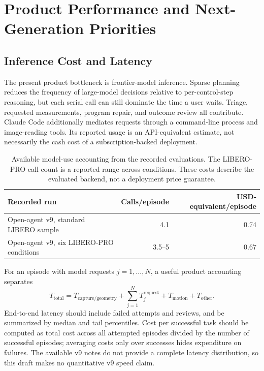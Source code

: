\section{Product Performance and Next-Generation Priorities}
\label{sec:discussion}

\subsection{Inference Cost and Latency}
The present product bottleneck is frontier-model inference. Sparse planning reduces the frequency of large-model decisions relative to per-control-step reasoning, but each serial call can still dominate the time a user waits. Triage, requested measurements, program repair, and outcome review all contribute. Claude Code additionally mediates requests through a command-line process and image-reading tools. Its reported usage is an API-equivalent estimate, not necessarily the cash cost of a subscription-backed deployment.

\begin{table}[t]
\centering
\begin{tabular}{@{}lrr@{}}
\toprule
Recorded run & Calls/episode & USD-equivalent/episode \\
\midrule
Open-agent v9, standard LIBERO sample & 4.1 & 0.74 \\
Open-agent v9, six LIBERO-PRO conditions & 3.5--5 & 0.67 \\
\bottomrule
\end{tabular}
\caption{Available model-use accounting from the recorded evaluations. The LIBERO-PRO call count is a reported range across conditions. These costs describe the evaluated backend, not a deployment price guarantee.}
\label{tab:cost}
\end{table}

For an episode with model requests $j=1,\ldots,N$, a useful product accounting separates
\begin{equation}
 T_{\mathrm{total}} = T_{\mathrm{capture/geometry}} + \sum_{j=1}^{N}T_j^{\mathrm{request}} + T_{\mathrm{motion}} + T_{\mathrm{other}}.
\end{equation}
End-to-end latency should include failed attempts and reviews, and be summarized by median and tail percentiles. Cost per successful task should be computed as total cost across all attempted episodes divided by the number of successful episodes; averaging costs only over successes hides expenditure on failures. The available v9 notes do not provide a complete latency distribution, so this draft makes no quantitative v9 speed claim.

